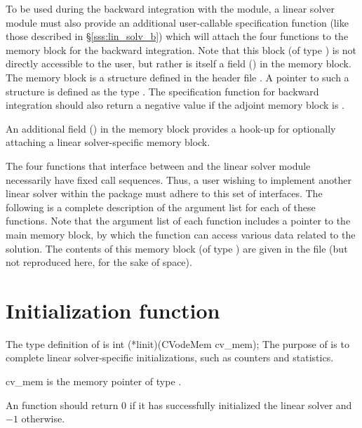 \vspace{0.1in}
To be used during the backward integration with the {\cvodea} module, a linear solver module 
must also provide an additional user-callable specification function (like those described in
\S\ref{sss:lin_solv_b}) which will attach the four functions to the {\cvodes} memory block for the
backward integration. Note that this block (of type ) is not
directly accessible to the user, but rather is itself a field () in the {\cvodea}
memory block. 
The {\cvodea} memory block is a structure defined in the header file . 
A pointer to such a structure is defined as the type .
The specification function for backward integration should also return a negative value
if the adjoint {\cvodea} memory block is .

An additional field () in the {\cvodea} memory block provides a hook-up for
optionally attaching a linear solver-specific memory block.

\vspace{0.1in}
The four functions that interface between {\cvodes} and the linear solver module
necessarily have fixed call sequences.  Thus, a user wishing to implement another 
linear solver within the {\cvodes} package must adhere to this set of interfaces.
The following is a complete description of the argument list for each of
these functions.  Note that the argument list of each function includes a
pointer to the main {\cvodes} memory block, by which the function can access
various data related to the {\cvodes} solution.  The contents of this memory
block (of type ) are given in the file  
(but not reproduced here, for the sake of space).


\section{Initialization function}
The type definition of  is
{
  int (*linit)(CVodeMem cv\_mem);
}
{
  The purpose of  is to complete linear solver-specific initializations,
  such as counters and statistics.        
}
{
  \begin{args}[cv\_mem]
  \item[cv\_mem]
    is the {\cvodes} memory pointer of type .
  \end{args}
}
{
  An  function should return $0$ if it 
  has successfully initialized the {\cvodes} linear solver and 
  $-1$ otherwise. 
}
{}

